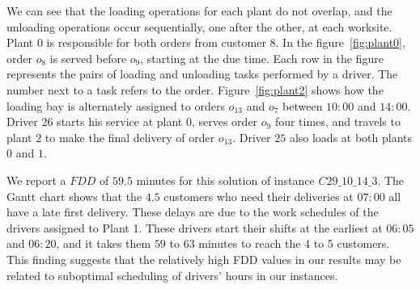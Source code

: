 \documentclass{article}
\begin{document}
We can see that the loading operations for each plant do not overlap, and the unloading operations occur sequentially, one after the other, at each worksite. Plant $0$ is responsible for both orders from customer $8$. In the figure~\ref*{fig:plant0}, order $o_8$ is served before $o_9$, starting at the due time. Each row in the figure represents the pairs of loading and unloading tasks performed by a driver. The number next to a task refers to the order.  Figure~\ref*{fig:plant2} shows how the loading bay is alternately assigned to orders $o_{13}$ and $o_7$ between $10:00$ and $14:00$. Driver $26$ starts his service at plant $0$, serves order $o_9$ four times, and travels to plant $2$ to make the final delivery of order $o_{13}$. Driver $25$ also loads at both plants $0$ and $1$.

We report a $FDD$ of $59.5$ minutes for this solution of instance $C29\_10\_14\_3$. The Gantt chart shows that the $4.5$ customers who need their deliveries at $07:00$ all have a late first delivery. These delays are due to the work schedules of the drivers assigned to Plant 1. These drivers start their shifts at the earliest at $06:05$ and $06:20$, and it takes them $59$ to $63$ minutes to reach the 4 to 5 customers. This finding suggests that the relatively high FDD values in our results may be related to suboptimal scheduling of drivers' hours in our instances.
\end{document}
